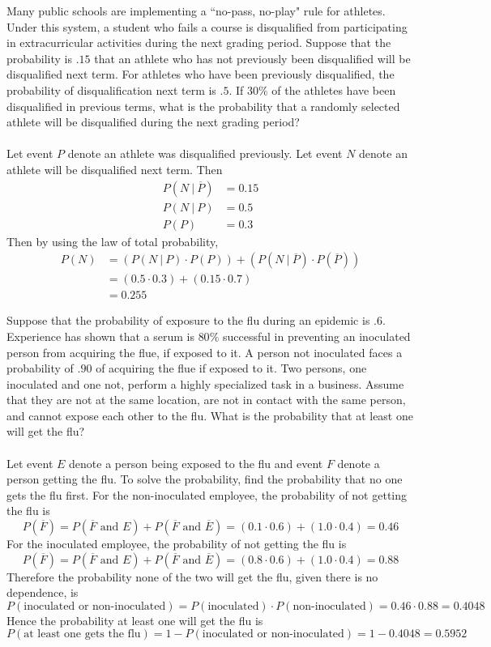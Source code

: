 \documentclass[12pt]{article}
\newcommand{\ques}[1]{\noindent {\bf Question #1: }}
\begin{document}
\newpage
\ques{2.174}

Many public schools are implementing a ``no-pass, no-play" rule for athletes. Under this system, a student who fails a course is disqualified from participating in extracurricular activities during the next grading period. Suppose that the probability is $.15$ that an athlete who has not previously been disqualified will be disqualified next term. For athletes who have been previously disqualified, the probability of disqualification next term is $.5$. If $30\%$ of the athletes have been disqualified in previous terms, what is the probability that a randomly selected athlete will be disqualified during the next grading period? \\~\\
Let event $P$ denote an athlete was disqualified previously. Let event $N$ denote an athlete will be disqualified next term. Then $$ \begin{aligned} P(N ~|~ \overline{P}) &= 0.15 \\ P(N ~|~ P) &= 0.5 \\ P(P) &= 0.3 \end{aligned} $$ 
Then by using the law of total probability, 
$$ \begin{aligned} P(N) &= (P(N ~|~ P) \cdot P(P)) + (P(N ~|~ \overline{P}) \cdot P(\overline{P})) \\ &= (0.5 \cdot 0.3) + (0.15 \cdot 0.7) \\ &= 0.255 \end{aligned} $$ 


\ques{2.178}

Suppose that the probability of exposure to the flu during an epidemic is $.6$. Experience has shown that a serum is $80\%$ successful in preventing an inoculated person from acquiring the flue, if exposed to it. A person not inoculated faces a probability of $.90$ of acquiring the flue if exposed to it. Two persons, one inoculated and one not, perform a highly specialized task in a business. Assume that they are not at the same location, are not in contact with the same person, and cannot expose each other to the flu. What is the probability that at least one will get the flu? \\~\\
Let event $E$ denote a person being exposed to the flu and event $F$ denote a person getting the flu. To solve the probability, find the probability that no one gets the flu first. For the non-inoculated employee, the probability of not getting the flu is $$ P(\overline{F}) = P(\overline{F} \text{ and } E) + P(\overline{F} \text{ and } \overline{E}) = (0.1 \cdot 0.6) + (1.0 \cdot 0.4) = 0.46 $$ 
For the inoculated employee, the probability of not getting the flu is $$ P(\overline{F}) = P(\overline{F} \text{ and } E) + P(\overline{F} \text{ and } \overline{E}) = (0.8 \cdot 0.6) + (1.0 \cdot 0.4) = 0.88 $$ 
Therefore the probability none of the two will get the flu, given there is no dependence, is $$ P(\text{inoculated or non-inoculated}) = P(\text{inoculated}) \cdot P(\text{non-inoculated}) = 0.46 \cdot 0.88 = 0.4048 $$ Hence the probability at least one will get the flu is $$ P(\text{at least one gets the flu}) = 1 - P(\text{inoculated or non-inoculated}) = 1 - 0.4048 = 0.5952 $$ 
\end{document}
